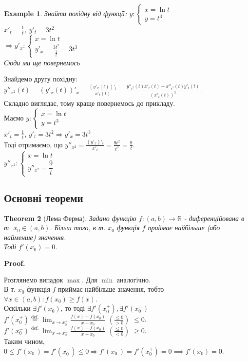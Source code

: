 \documentclass[a4paper, 14pt]{article}
\makeatletter
\def\huge{\displaystyle}
\def\qed{$\blacksquare$}
\theoremstyle{theoremdd}
\newtheorem{theorem}{Theorem}[subsection]
\theoremstyle{theoremdd}
\theoremstyle{theoremdd}
\theoremstyle{theoremdd}
\newtheorem{example}[theorem]{Example}
\theoremstyle{theoremdd}
\theoremstyle{theoremdd}
\theoremstyle{theoremdd}
\theoremstyle{theoremdd}
\renewenvironment{proof}[1][Proof.\\]{\par
\pushQED{\hfill \qed}%
\normalfont \topsep6\p@\@plus6\p@\relax
\trivlist
\item\relax
{\bfseries
#1\@addpunct{.}}\hspace\labelsep\ignorespaces
}{%
\popQED\endtrivlist\@endpefalse
}
\makeatother
\begin{document}
\begin{example}
Знайти похідну від функції: $y: \begin{cases} x = \ln t \\ y = t^3 \end{cases}$\\
$x'_t = \huge \frac{1}{t}$,    $y'_t = 3t^2$\\
$\Rightarrow \huge  y'_x: \begin{cases} x = \ln t \\ y'_x = \huge \frac{3t^2}{\frac{1}{t}} = 3t^3 \end{cases}$\\
Сюди ми ще повернемось
\end{example}

Знайдемо другу похідну:\\
$\huge y''_{x^2}(t) = (y'_x(t))'_x = \frac{(y'_x(t))'_t}{x'_t(t)} = \frac{y''_{t^2}(t)x'_t(t)-x''_{t^2}(t)y'_t(t)}{(x'_t(t))^3}$.
\bigskip \\
Складно виглядає, тому краще повернемось до прикладу.\\
Маємо $y: \begin{cases} x = \ln t \\ y = t^3 \end{cases}$\\
$x'_t = \huge \frac{1}{t}$,    $y'_t = 3t^2 \Rightarrow y'_x = 3t^3$\\
Тоді отримаємо, що $y''_{x^2} = \huge \frac{(y'_x)'_t}{x'_t} = \frac{9t^2}{t^3} = \frac{9}{t}$.\\
$y''_{x^2}: \begin{cases} x = \ln t \\ y''_{x^2} = \dfrac{9}{t} \end{cases}$

\subsection{Основні теореми}
\begin{theorem}[Лема Ферма]
Задано функцію $f: (a,b) \to \mathbb{R}$ - диференційована в т. $x_0 \in (a,b)$. Більш того, в т. $x_0$ функція $f$ приймає найбільше (або найменше) значення. \\ Тоді $f'(x_0)=0$.
\end{theorem}

\begin{proof}
Розглянемо випадок $\max$. Для $\min$ аналогічно.\\
В т. $x_0$ функція $f$ приймає найбільше значення, тобто $\forall x \in (a,b): f(x_0) \geq f(x)$.\\
Оскільки $\exists f'(x_0)$, то тоді $\exists f'(x_0^+), \exists f'(x_0^-)$\\
$f'(x_0^+) \huge \overset{\textrm{def.}}{=} \lim_{x \to x_0^+} \frac{f(x)-f(x_0)}{x-x_0}$  $\left( \frac{\leq 0}{> 0} \right)$ $\leq 0$.\\
$f'(x_0^-) \huge \overset{\textrm{def.}}{=} \lim_{x \to x_0^-} \frac{f(x)-f(x_0)}{x-x_0}$ $\left( \frac{\leq 0}{< 0} \right)$ $\geq 0$.\\
Таким чином, $0 \leq f'(x_0^-) = f'(x_0^+) \leq 0 \Rightarrow f'(x_0^-) = f'(x_0^+) = 0 \implies f'(x_0) = 0$.
\end{proof}
\end{document}
